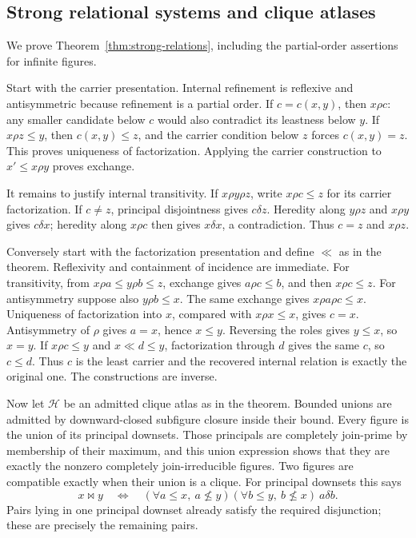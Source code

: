 \subsection{Strong relational systems and clique atlases}
We prove Theorem~\ref{thm:strong-relations}, including the
partial-order assertions for infinite figures.

Start with the carrier presentation. Internal refinement is
reflexive and antisymmetric because refinement is a partial order.
If $c=c(x,y)$, then $x\rho c$: any smaller candidate below $c$
would also contradict its leastness below $y$.
If $x\rho z\leq y$, then $c(x,y)\leq z$, and the carrier
condition below $z$ forces $c(x,y)=z$. This proves uniqueness
of factorization. Applying the carrier construction to
$x'\leq x\rho y$ proves exchange.

It remains to justify internal transitivity. If $x\rho y\rho z$,
write $x\rho c\leq z$ for its carrier factorization.
If $c\ne z$, principal disjointness gives $c\delta z$.
Heredity along $y\rho z$ and $x\rho y$ gives $c\delta x$;
heredity along $x\rho c$ then gives $x\delta x$, a contradiction.
Thus $c=z$ and $x\rho z$.

Conversely start with the factorization presentation and define
$\ll$ as in the theorem. Reflexivity and containment of incidence
are immediate. For transitivity, from
$x\rho a\leq y\rho b\leq z$, exchange gives
$a\rho c\leq b$, and then $x\rho c\leq z$.
For antisymmetry suppose also $y\rho b\leq x$.
The same exchange gives $x\rho a\rho c\leq x$.
Uniqueness of factorization into $x$, compared with
$x\rho x\leq x$, gives $c=x$. Antisymmetry of $\rho$
gives $a=x$, hence $x\leq y$. Reversing the roles gives
$y\leq x$, so $x=y$.
If $x\rho c\leq y$ and $x\ll d\leq y$, factorization
through $d$ gives the same $c$, so $c\leq d$.
Thus $c$ is the least carrier and the recovered internal relation
is exactly the original one. The constructions are inverse.

Now let $\mathscr H$ be an admitted clique atlas as in the theorem.
Bounded unions are admitted by downward-closed subfigure closure
inside their bound. Every figure is the union of its principal
downsets. Those principals are completely join-prime by membership
of their maximum, and this union expression shows that they are
exactly the nonzero completely join-irreducible figures.
Two figures are compatible exactly when their union is a clique.
For principal downsets this says
\[
 x\bowtie y\quad\Longleftrightarrow\quad
 (\forall a\leq x,\ a\not\leq y)
 (\forall b\leq y,\ b\not\leq x)\ a\delta b.
\]
Pairs lying in one principal downset already satisfy the required
disjunction; these are precisely the remaining pairs.


